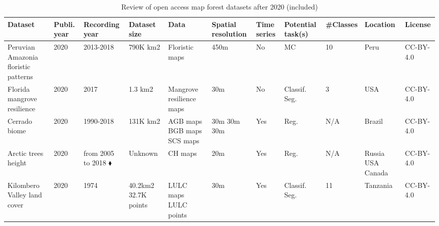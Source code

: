 \documentclass{CUP-JNL-DTM}%
\theoremstyle{definition}
\numberwithin{equation}{section}
\begin{document}
\begin{table*}[ht]
\fontsize{6.5pt}{7.5pt}\selectfont %
\renewcommand{\arraystretch}{1.5} %
\setlength\tabcolsep{5pt} %
\caption{Review of open access map forest datasets after 2020 (included)}
{\begin{fntable}
\centering
\begin{tabular}{p{1.5cm} | p{0.4cm} | p{1cm} | p{1.3cm} | p{1.2cm} : p{1cm} | p{0.4cm} | p{0.7cm} | p{0.8cm} | p{1cm} | p{1.1cm}}
\toprule
Dataset  & Publi. year & Recording year & Dataset size & Data  & Spatial resolution & Time series & Potential task(s) & \#Classes & Location  & License  \\
\midrule

Peruvian Amazonia floristic patterns \cite{chaves_mapping_2020} & 2020 & 2013-2018 & 790K km2 & Floristic maps & 450m & No & MC & 10 & Peru & CC-BY-4.0 \\

Florida mangrove resilience \cite{lagomasino_storm_2020} & 2020 & 2017 & 1.3 km2 & Mangrove resilience maps  & 30m & No & Classif. \newline Seg. & 3 & USA & CC-BY-4.0 \\

Cerrado biome \cite{dionizio_carbon_2020} & 2020 & 1990-2018 & 131K km2 & AGB maps \newline BGB maps \newline SCS maps & 30m \newline 30m \newline 30m & Yes & Reg. & N/A & Brazil & CC-BY-4.0 \\

Arctic trees height	\cite{bartsch_land_2016, bartsch_feasibility_2020} & 2020 & from 2005 to 2018 $\blacklozenge$ & Unknown & CH maps & 20m & Yes & Reg. & N/A & Russia \newline  USA \newline Canada & CC-BY-4.0 \\

Kilombero Valley land cover	\cite{thonfeld_long-term_2020} & 2020 & 1974     & 40.2km2 \newline 32.7K points & LULC maps \newline LULC points & 30m \newline 1cm & Yes & Classif. \newline Seg. & 11 & Tanzania & CC-BY-4.0 \\


\end{tabular}
\end{fntable}}
\end{table*}
\end{document}
